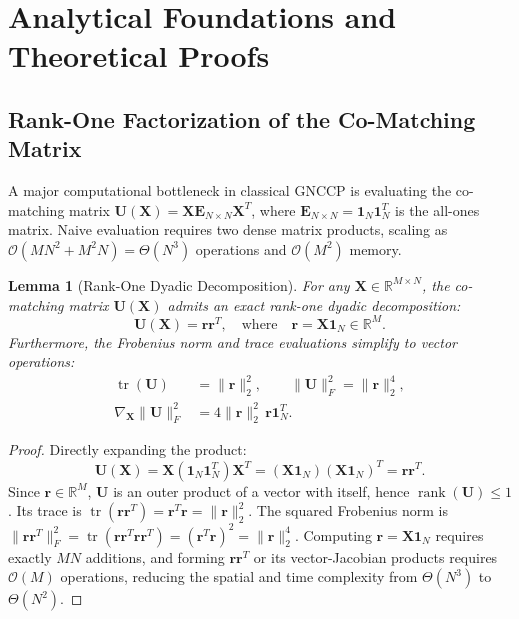 \documentclass[a4paper,fleqn]{cas-dc}
\theoremstyle{thmstyleone}
\newtheorem{lemma}[theorem]{Lemma}
\theoremstyle{thmstyletwo}
\theoremstyle{thmstylethree}
\begin{document}
\section{Analytical Foundations and Theoretical Proofs}
\label{sec:proofs}

\subsection{Rank-One Factorization of the Co-Matching Matrix}
A major computational bottleneck in classical GNCCP is evaluating the co-matching matrix $\mathbf{U}(\mathbf{X}) = \mathbf{X}\mathbf{E}_{N \times N}\mathbf{X}^T$, where $\mathbf{E}_{N \times N} = \mathbf{1}_N\mathbf{1}_N^T$ is the all-ones matrix. Naive evaluation requires two dense matrix products, scaling as $\mathcal{O}(M N^2 + M^2 N) = \Theta(N^3)$ operations and $\mathcal{O}(M^2)$ memory.

\begin{lemma}[Rank-One Dyadic Decomposition]
\label{lem:rank1}
For any $\mathbf{X} \in \mathbb{R}^{M \times N}$, the co-matching matrix $\mathbf{U}(\mathbf{X})$ admits an exact rank-one dyadic decomposition:
\begin{equation}
\mathbf{U}(\mathbf{X}) = \mathbf{r}\mathbf{r}^T, \quad \text{where} \quad \mathbf{r} = \mathbf{X}\mathbf{1}_N \in \mathbb{R}^M.
\label{eq:rank1}
\end{equation}
Furthermore, the Frobenius norm and trace evaluations simplify to vector operations:
\begin{align}
\operatorname{tr}(\mathbf{U}) &= \|\mathbf{r}\|_2^2, \qquad \|\mathbf{U}\|_F^2 = \|\mathbf{r}\|_2^4, \nonumber \\
\nabla_{\mathbf{X}} \|\mathbf{U}\|_F^2 &= 4 \|\mathbf{r}\|_2^2 \, \mathbf{r}\mathbf{1}_N^T.
\label{eq:rank1_props}
\end{align}
\end{lemma}
\begin{proof}
Directly expanding the product:
\begin{equation}
\mathbf{U}(\mathbf{X}) = \mathbf{X}(\mathbf{1}_N\mathbf{1}_N^T)\mathbf{X}^T = (\mathbf{X}\mathbf{1}_N)(\mathbf{X}\mathbf{1}_N)^T = \mathbf{r}\mathbf{r}^T.
\end{equation}
Since $\mathbf{r} \in \mathbb{R}^M$, $\mathbf{U}$ is an outer product of a vector with itself, hence $\operatorname{rank}(\mathbf{U}) \le 1$. Its trace is $\operatorname{tr}(\mathbf{r}\mathbf{r}^T) = \mathbf{r}^T\mathbf{r} = \|\mathbf{r}\|_2^2$. The squared Frobenius norm is $\|\mathbf{r}\mathbf{r}^T\|_F^2 = \operatorname{tr}(\mathbf{r}\mathbf{r}^T\mathbf{r}\mathbf{r}^T) = (\mathbf{r}^T\mathbf{r})^2 = \|\mathbf{r}\|_2^4$. Computing $\mathbf{r} = \mathbf{X}\mathbf{1}_N$ requires exactly $M N$ additions, and forming $\mathbf{r}\mathbf{r}^T$ or its vector-Jacobian products requires $\mathcal{O}(M)$ operations, reducing the spatial and time complexity from $\Theta(N^3)$ to $\Theta(N^2)$.
\end{proof}
\end{document}
